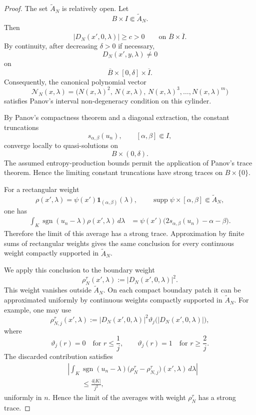 \documentclass[11pt]{amsart}
\numberwithin{equation}{section}
\theoremstyle{plain}
\theoremstyle{definition}
\theoremstyle{remark}
\begin{document}
\begin{proof}
The set \(\widetilde A_N\) is relatively open.  Let
\[
    B\times I\Subset\widetilde A_N.
\]
Then
\[
    |D_N(x',0,\lambda)|\ge c>0
    \qquad
    \text{on }\overline B\times\overline I.
\]
By continuity, after decreasing \(\delta>0\) if necessary,
\[
    D_N(x',y,\lambda)\neq0
\]
on
\[
    \overline B\times[0,\delta]\times\overline I.
\]
Consequently, the canonical polynomial vector
\[
    \mathcal N_N(x,\lambda)
    =
    \bigl(
        N(x,\lambda)^2,\,
        N(x,\lambda),\,
        N(x,\lambda)^3,\ldots,
        N(x,\lambda)^m
    \bigr)
\]
satisfies Panov's interval non-degeneracy condition on this cylinder.

By Panov's compactness theorem and a diagonal extraction, the constant
truncations
\[
    s_{\alpha,\beta}(u_n),
    \qquad
    [\alpha,\beta]\Subset I,
\]
converge locally to quasi-solutions on
\[
    B\times(0,\delta).
\]
The assumed entropy-production bounds permit the application of Panov's trace
theorem.  Hence the limiting constant truncations have strong traces on
\(B\times\{0\}\).

For a rectangular weight
\[
    \rho(x',\lambda)
    =
    \psi(x')\mathbf 1_{(\alpha,\beta)}(\lambda),
    \qquad
    \operatorname{supp}\psi
    \times[\alpha,\beta]
    \Subset\widetilde A_N,
\]
one has
\[
\begin{aligned}
    \int_K
        \operatorname{sgn}(u_n-\lambda)
        \rho(x',\lambda)\,d\lambda
    &=
    \psi(x')
    \bigl(
        2s_{\alpha,\beta}(u_n)-\alpha-\beta
    \bigr).
\end{aligned}
\]
Therefore the limit of this average has a strong trace.  Approximation by
finite sums of rectangular weights gives the same conclusion for every
continuous weight compactly supported in \(\widetilde A_N\).

We apply this conclusion to the boundary weight
\[
    \rho_N^\tau(x',\lambda)
    :=
    |D_N(x',0,\lambda)|^2.
\]
This weight vanishes outside \(\widetilde A_N\).  On each compact boundary
patch it can be approximated uniformly by continuous weights compactly
supported in \(\widetilde A_N\).  For example, one may use
\[
    \rho_{N,j}^\tau(x',\lambda)
    :=
    |D_N(x',0,\lambda)|^2
    \vartheta_j\bigl(|D_N(x',0,\lambda)|\bigr),
\]
where
\[
    \vartheta_j(r)=0
    \quad\text{for }r\le\frac1j,
    \qquad
    \vartheta_j(r)=1
    \quad\text{for }r\ge\frac2j.
\]
The discarded contribution satisfies
\[
\begin{aligned}
&\left|
    \int_K
        \operatorname{sgn}(u_n-\lambda)
        \bigl(
            \rho_N^\tau-\rho_{N,j}^\tau
        \bigr)(x',\lambda)\,d\lambda
\right|
\\
&\qquad\le
    \frac{4|K|}{j^2},
\end{aligned}
\]
uniformly in \(n\).  Hence the limit of the averages with weight
\(\rho_N^\tau\) has a strong trace.


\end{proof}
\end{document}
